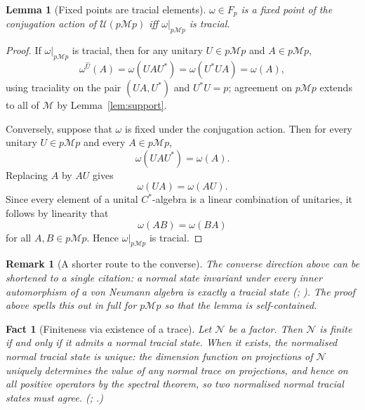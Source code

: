 \documentclass[11pt]{article}
\newtheorem{remark}[theorem]{Remark}
\newtheorem{lemma}[theorem]{Lemma}
\newtheorem{fact}[theorem]{Fact}
\begin{document}
\begin{lemma}[Fixed points are tracial elements]
\label{lem:tracial}
$\omega\in F_p$ is a fixed point of the conjugation action of
$\mathcal U(p\mathcal Mp)$ iff $\omega|_{p\mathcal Mp}$ is tracial.
\end{lemma}

\begin{proof}
If $\omega|_{p\mathcal Mp}$ is tracial, then for any unitary
$U\in p\mathcal Mp$ and $A\in p\mathcal Mp$,
\[
\omega^{\widehat U}(A)=\omega(UAU^*)=\omega(U^*UA)=\omega(A),
\]
using traciality on the pair $(UA,U^*)$ and $U^*U=p$; agreement on
$p\mathcal Mp$ extends to all of $\mathcal M$ by Lemma~\ref{lem:support}.

Conversely, suppose that $\omega$ is fixed under the conjugation action.
Then for every unitary $U\in p\mathcal Mp$ and every $A\in p\mathcal Mp$,
\[
\omega(UAU^*)=\omega(A).
\]
Replacing $A$ by $AU$ gives
\[
\omega(UA)=\omega(AU).
\]
Since every element of a unital $C^*$-algebra is a linear combination
of unitaries, it follows by linearity that
\[
\omega(AB)=\omega(BA)
\]
for all $A,B\in p\mathcal Mp$. Hence
$\omega|_{p\mathcal Mp}$ is tracial.
\end{proof}

\begin{remark}[A shorter route to the converse]
The converse direction above can be shortened to a single citation: a
normal state invariant under every inner automorphism of a von Neumann
algebra is exactly a tracial state (\cite[Prop.~8.5.16]{KadisonRingrose2}; \cite[\S1.9]{Sakai}). The proof above spells this out in full for $p\mathcal Mp$ so
that the lemma is self-contained.
\end{remark}

\begin{fact}[Finiteness via existence of a trace]
\label{fact:finitetrace}
Let $\mathcal N$ be a factor. Then $\mathcal N$ is finite if and only
if it admits a normal tracial state. When it exists, the normalised
normal tracial state is unique: the dimension function on projections
of $\mathcal N$ uniquely determines the value of any normal trace on
projections, and hence on all positive operators by the spectral
theorem, so two normalised normal tracial states must agree.
(\cite[Ch.~III, \S7, Thm.~1--2]{Dixmier}; \cite[Thm.~2.5.3]{Sakai}.)
\end{fact}
\end{document}
